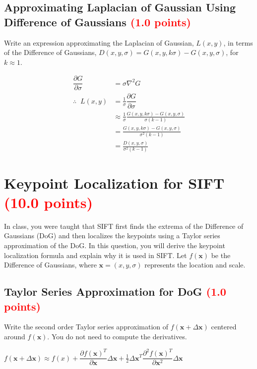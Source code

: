 \documentclass[answers]{exam}
\newcommand{\mypoints}[1]{\textcolor{red}{(#1 points)}}
\begin{document}
\subsection{Approximating Laplacian of Gaussian Using Difference of Gaussians \mypoints{1.0}}
Write an expression approximating the Laplacian of Gaussian, $L(x, y)$, in terms of the Difference of Gaussians, $D(x,y,\sigma)=G(x,y,k\sigma)-G(x,y,\sigma)$, for $k \approx 1$.
\begin{solution}
\begin{align*}
    \dfrac{\partial G}{\partial \sigma}&= \sigma \nabla^2 G \\
    \therefore\;\;L(x,y)&=\frac{1}{\sigma}\dfrac{\partial G}{\partial \sigma}\\
    &\approx \frac{1}{\sigma}\frac{G(x,y,k\sigma)-G(x,y,\sigma)}{\sigma(k-1)}\\
    &=\frac{G(x,y,k\sigma)-G(x,y,\sigma)}{\sigma^2(k-1)}\\
    &=\frac{D(x,y,\sigma)}{\sigma^2(k-1)}
\end{align*}
\end{solution}

\newpage
\section{Keypoint Localization for SIFT \mypoints{10.0}}
In class, you were taught that SIFT first finds the extrema of the Difference of Gaussians (DoG) and then localizes the keypoints using a Taylor series approximation of the DoG. In this question, you will derive the keypoint localization formula and explain why it is used in SIFT. Let $f(\mathbf{x})$ be the Difference of Gaussians, where $\mathbf{x} = (x, y, \sigma)$ represents the location and scale.

\subsection{Taylor Series Approximation for DoG \mypoints{1.0}}
Write the second order Taylor series approximation of $f(\mathbf{x} + \Delta \mathbf{x})$ centered around $f(\mathbf{x})$. You do not need to compute the derivatives.
\begin{solution}
$f(\mathbf{x} + \Delta \mathbf{x})\approx
f(x)+\dfrac{\partial f(\mathbf{x})^T}{\partial \mathbf{x}}\Delta \mathbf{x}+\frac{1}{2}\Delta \mathbf{x}^T\dfrac{\partial^2 f(\mathbf{x})^T}{\partial \mathbf{x}^2}\Delta \mathbf{x}$
\end{solution}
\end{document}
